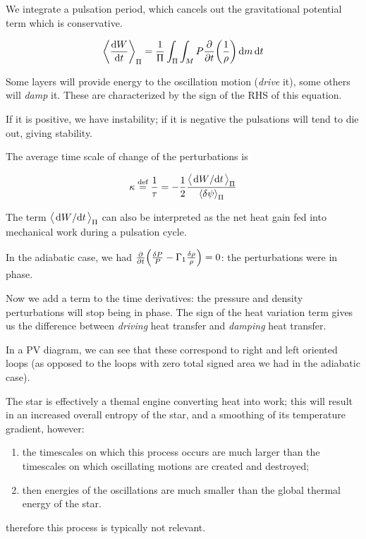 \documentclass[main.tex]{subfiles}
\begin{document}
We integrate a pulsation period, which cancels out the gravitational potential term which is conservative.

\begin{equation}
  \expval{\dv{W}{t}}_\Pi = \frac{1}{\Pi} \int_\Pi \int_M   P \pdv{}{t} \qty(\frac{1}{\rho}) \dd{m} \dd{t}
\end{equation}

Some layers will provide energy to the oscillation motion (\emph{drive} it), some others will \emph{damp} it.
These are characterized by the sign of the RHS of this equation.

If it is positive, we have instability; if it is negative the pulsations will tend to die out, giving stability.

The average time scale of change of the perturbations is

\begin{equation}
  \kappa \defeq \frac{1}{\tau} = -\frac{1}{2} \frac{\expval{\dv*{W}{t}}_\Pi}{\expval{ \delta \psi}_\Pi }
\end{equation}

The term \(\expval{\dv*{W}{t}}_\Pi \) can also be interpreted as the net heat gain fed into mechanical work during a pulsation cycle.

In the adiabatic case, we had \(\pdv{}{t}\qty( \frac{\delta P}{P} - \Gamma_1 \frac{\delta \rho}{\rho}) =0 \): the perturbations were in phase.

Now we add a term to the time derivatives: the pressure and density perturbations will stop being in phase. The sign of the heat variation term gives us the difference between \emph{driving} heat transfer and \emph{damping} heat transfer.

In a PV diagram, we can see that these correspond to right and left oriented loops (as opposed to the loops with zero total signed area we had in the adiabatic case).

\begin{bluebox}
    The star is effectively a themal engine converting heat into work; this will result in an increased overall entropy of the star, and a smoothing of its temperature gradient, however:
    \begin{enumerate}
        \item the timescales on which this process occurs are much larger than the timescales on which oscillating motions are created and destroyed;
        \item then energies of the oscillations are much smaller than the global thermal energy of the star.
    \end{enumerate}
    therefore this process is typically not relevant.
\end{bluebox}
\end{document}

